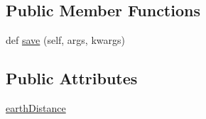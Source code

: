 \subsection*{Public Member Functions}
\begin{DoxyCompactItemize}
\item 
def \hyperlink{class_ground_segment_1_1models_1_1_propagation_detail_1_1_propagation_detail_af4f51f559651a468eee06b81b2fafd98}{save} (self, args, kwargs)
\end{DoxyCompactItemize}
\subsection*{Public Attributes}
\begin{DoxyCompactItemize}
\item 
\hyperlink{class_ground_segment_1_1models_1_1_propagation_detail_1_1_propagation_detail_ad4ca6c25f7f244d098cb060f2b91571e}{earth\+Distance}
\end{DoxyCompactItemize}
